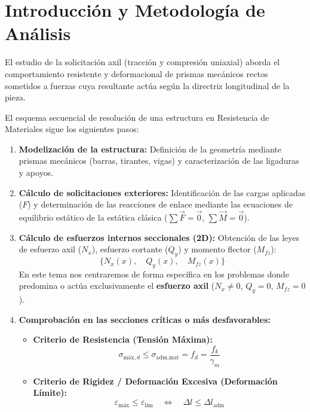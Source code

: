 \section{Introducción y Metodología de Análisis}

El estudio de la solicitación axil (tracción y compresión uniaxial) aborda el comportamiento resistente y deformacional de prismas mecánicos rectos sometidos a fuerzas cuya resultante actúa según la directriz longitudinal de la pieza.

El esquema secuencial de resolución de una estructura en Resistencia de Materiales sigue los siguientes pasos:
\begin{enumerate}
    \item \textbf{Modelización de la estructura:} Definición de la geometría mediante prismas mecánicos (barras, tirantes, vigas) y caracterización de las ligaduras y apoyos.
    \item \textbf{Cálculo de solicitaciones exteriores:} Identificación de las cargas aplicadas ($F$) y determinación de las reacciones de enlace mediante las ecuaciones de equilibrio estático de la estática clásica ($\sum \vec{F} = \vec{0}$, $\sum \vec{M} = \vec{0}$).
    \item \textbf{Cálculo de esfuerzos internos seccionales (2D):} Obtención de las leyes de esfuerzo axil ($N_x$), esfuerzo cortante ($Q_y$) y momento flector ($M_{fz}$):
          \begin{equation}
              \{ N_x(x), \quad Q_y(x), \quad M_{fz}(x) \}
          \end{equation}
          En este tema nos centraremos de forma específica en los problemas donde predomina o actúa exclusivamente el \textbf{esfuerzo axil} ($N_x \neq 0$, $Q_y = 0$, $M_{fz} = 0$).
    \item \textbf{Comprobación en las secciones críticas o más desfavorables:}
          \begin{itemize}
              \item \textbf{Criterio de Resistencia (Tensión Máxima):}
                    \begin{equation}
                        \sigma_{\text{máx},d} \le \sigma_{\text{adm,mat}} = f_d = \frac{f_k}{\gamma_m}
                    \end{equation}
              \item \textbf{Criterio de Rigidez / Deformación Excesiva (Deformación Límite):}
                    \begin{equation}
                        \varepsilon_{\text{máx}} \le \varepsilon_{\text{lím}} \quad \Longleftrightarrow \quad \Delta l \le \Delta l_{\text{adm}}
                    \end{equation}
          \end{itemize}
\end{enumerate}

